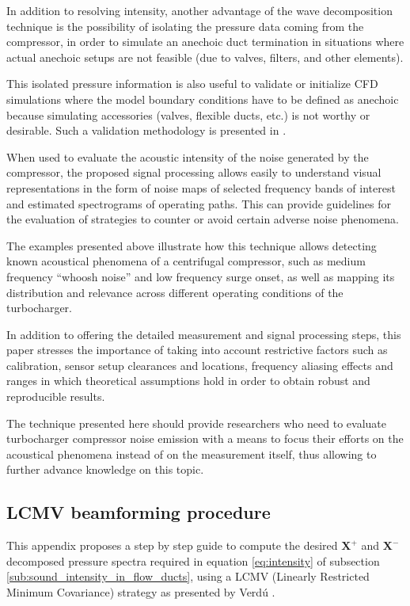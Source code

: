 In addition to resolving intensity, another advantage of the wave decomposition technique is the possibility of isolating the pressure data coming from the compressor, in order to simulate an anechoic duct termination in situations where actual anechoic setups are not feasible (due to valves, filters, and other elements).

This isolated pressure information is also useful to validate or initialize CFD simulations where the model boundary conditions have to be defined as anechoic because simulating accessories (valves, flexible ducts, etc.) is not worthy or desirable. Such a validation methodology is presented in \cite{broatch2014methodology}.

When used to evaluate the acoustic intensity of the noise generated by the compressor, the proposed signal processing allows easily to understand visual representations in the form of noise maps of selected frequency bands of interest and estimated spectrograms of operating paths. This can provide guidelines for the evaluation of strategies to counter or avoid certain adverse noise phenomena.

The examples presented above illustrate how this technique allows detecting known acoustical phenomena of a  centrifugal compressor, such as medium frequency ``whoosh noise'' and low frequency surge onset, as well as mapping its distribution and relevance across different operating conditions of the turbocharger.

In addition to offering the detailed measurement and signal processing steps, this paper stresses the importance of taking into account restrictive factors such as calibration, sensor setup clearances and locations, frequency aliasing effects and ranges in which theoretical assumptions hold in order to obtain robust and reproducible results.

The technique presented here should provide researchers who need to evaluate turbocharger compressor noise emission with a means to focus their efforts on the acoustical phenomena instead of on the measurement itself, thus allowing to further advance knowledge on this topic.

\subsection{LCMV beamforming procedure}
\label{ann:beamformer}

This appendix proposes a step by step guide to compute the desired $\mathbf X^+$ and $\mathbf X^-$ decomposed pressure spectra required in equation \ref{eq:intensity} of subsection \ref{sub:sound_intensity_in_flow_ducts}, using a LCMV (Linearly Restricted Minimum Covariance) strategy as presented by Verdú \cite{verdu2003contribucion}.

